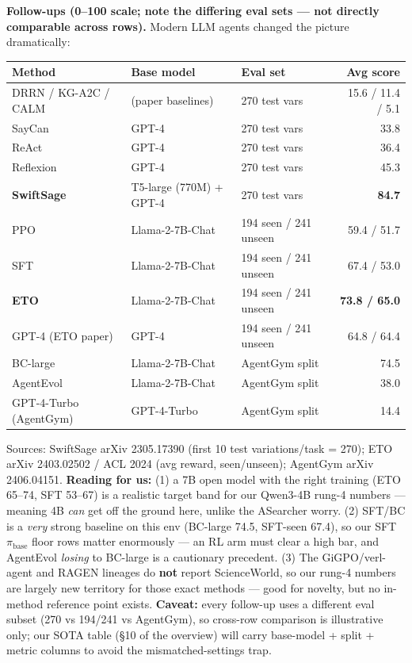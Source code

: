 \documentclass[10pt]{article}
\begin{document}
\smallskip
\noindent\textbf{Follow-ups (0--100 scale; note the differing eval sets --- not directly comparable across
rows).} Modern LLM agents changed the picture dramatically:
\begin{center}\small
\begin{tabular}{lllr}
\toprule
Method & Base model & Eval set & Avg score \\
\midrule
DRRN / KG-A2C / CALM & (paper baselines) & 270 test vars & 15.6 / 11.4 / 5.1 \\
SayCan & GPT-4 & 270 test vars & 33.8 \\
ReAct & GPT-4 & 270 test vars & 36.4 \\
Reflexion & GPT-4 & 270 test vars & 45.3 \\
\textbf{SwiftSage} & T5-large (770M) + GPT-4 & 270 test vars & \textbf{84.7} \\
\midrule
PPO & Llama-2-7B-Chat & 194 seen / 241 unseen & 59.4 / 51.7 \\
SFT & Llama-2-7B-Chat & 194 seen / 241 unseen & 67.4 / 53.0 \\
\textbf{ETO} & Llama-2-7B-Chat & 194 seen / 241 unseen & \textbf{73.8 / 65.0} \\
GPT-4 (ETO paper) & GPT-4 & 194 seen / 241 unseen & 64.8 / 64.4 \\
\midrule
BC-large & Llama-2-7B-Chat & AgentGym split & 74.5 \\
AgentEvol & Llama-2-7B-Chat & AgentGym split & 38.0 \\
GPT-4-Turbo (AgentGym) & GPT-4-Turbo & AgentGym split & 14.4 \\
\bottomrule
\end{tabular}
\end{center}
\noindent\footnotesize Sources: SwiftSage arXiv 2305.17390 (first 10 test variations/task = 270);
ETO arXiv 2403.02502 / ACL 2024 (avg reward, seen/unseen); AgentGym arXiv 2406.04151.
\textbf{Reading for us:} (1) a 7B open model with the right training (ETO 65--74, SFT 53--67) is a
realistic target band for our Qwen3-4B rung-4 numbers --- meaning 4B \emph{can} get off the ground here,
unlike the ASearcher worry. (2) SFT/BC is a \emph{very} strong baseline on this env (BC-large 74.5,
SFT-seen 67.4), so our SFT $\pi_\text{base}$ floor rows matter enormously --- an RL arm must clear a high
bar, and AgentEvol \emph{losing} to BC-large is a cautionary precedent. (3) The GiGPO/verl-agent and
RAGEN lineages do \textbf{not} report ScienceWorld, so our rung-4 numbers are largely new territory for
those exact methods --- good for novelty, but no in-method reference point exists. \textbf{Caveat:} every
follow-up uses a different eval subset (270 vs 194/241 vs AgentGym), so cross-row comparison is
illustrative only; our SOTA table (§10 of the overview) will carry base-model + split + metric columns to
avoid the mismatched-settings trap.\normalsize
\end{document}

